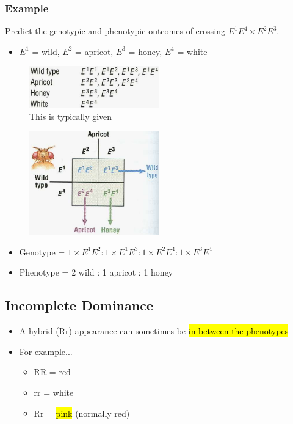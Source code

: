 \documentclass[a4paper,12pt]{article}
\begin{document}
\subsubsection{Example}
Predict the genotypic and phenotypic outcomes of crossing $E^1E^4 \times E^2E^3$.

\begin{itemize}
    \item{$E^1$ = wild, $E^2$ = apricot, $E^3$ = honey, $E^4$ = white}
\end{itemize}

\begin{figure}[H]
    \centering
    \includegraphics[width=0.50\textwidth]{ex1a}
    \caption{This is typically given}
\end{figure}

\begin{figure}[H]
    \centering
    \includegraphics[width=0.50\textwidth]{ex1b}
\end{figure}

\begin{itemize}
    \item{Genotype = $1 \times E^1E^2 : 1 \times E^1E^3 : 1 \times E^2E^4 : 1 \times E^3E^4$}
    \item{Phenotype = 2 wild : 1 apricot : 1 honey}
\end{itemize}

\subsection{Incomplete Dominance}
\begin{itemize}
    \item{A hybrid (Rr) appearance can sometimes be \hl{in between the phenotypes}}
    \item{
            For example...
            \begin{itemize}
                \item{RR = red}
                \item{rr = white}
                \item{Rr = \hl{pink} (normally red)}
            \end{itemize}
        }
\end{itemize}
\end{document}
